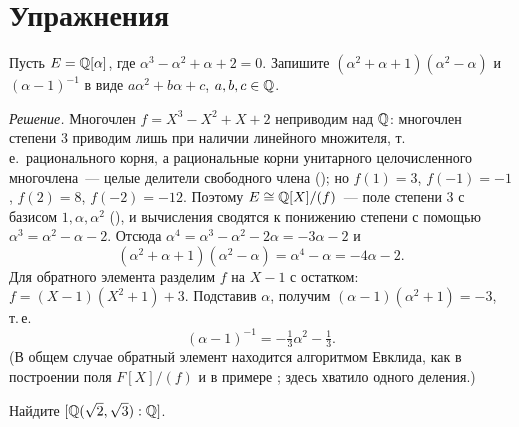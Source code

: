 \makeatletter
{}
\makeatother
\section*{Упражнения}

\begin{exercise}[1-1]
Пусть $E=\mathbb Q[\alpha]$, где $\alpha^3-\alpha^2+\alpha+2=0$. Запишите $(\alpha^2+\alpha+1)(\alpha^2-\alpha)$ и $(\alpha-1)^{-1}$ в виде
$a\alpha^2+b\alpha+c$, $a,b,c\in\mathbb Q$.
\end{exercise}

\noindent\emph{Решение.} Многочлен $f=X^3-X^2+X+2$ неприводим над $\mathbb Q$: многочлен степени $3$ приводим лишь при
наличии линейного множителя, т.\,е.\ рационального корня, а рациональные корни унитарного целочисленного многочлена~---
целые делители свободного члена (); но $f(1)=3$, $f(-1)=-1$, $f(2)=8$, $f(-2)=-12$. Поэтому
$E\cong\mathbb Q[X]/(f)$~--- поле степени $3$ с базисом $1,\alpha,\alpha^2$ (), и вычисления сводятся к понижению степени с
помощью $\alpha^3=\alpha^2-\alpha-2$. Отсюда $\alpha^4=\alpha^3-\alpha^2-2\alpha=-3\alpha-2$ и
\[
(\alpha^2+\alpha+1)(\alpha^2-\alpha)=\alpha^4-\alpha=-4\alpha-2 .
\]
Для обратного элемента разделим $f$ на $X-1$ с остатком: $f=(X-1)(X^2+1)+3$. Подставив $\alpha$, получим
$(\alpha-1)(\alpha^2+1)=-3$, т.\,е.
\[
(\alpha-1)^{-1}=-\tfrac13\alpha^2-\tfrac13 .
\]
(В общем случае обратный элемент находится алгоритмом Евклида, как в построении поля $F[X]/(f)$ и в примере ;
здесь хватило одного деления.)

\begin{exercise}[1-2]
Найдите $[\mathbb Q(\sqrt2,\sqrt3):\mathbb Q]$.
\end{exercise}

